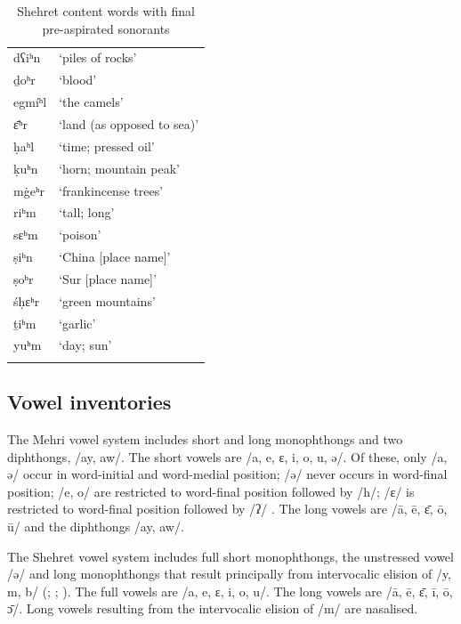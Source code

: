 \documentclass[output=paper]{langscibook}
\begin{document}
\begin{table}
\begin{floatrow}
{\begin{tabular}{ll}
dʕiʰn    &  ‘piles of rocks’           \\
ḏoʰr     &  ‘blood’                    \\
egmíʰl   &  ‘the camels’               \\
ɛ̄ʰr &  ‘land (as opposed to sea)’ \\
ḥaʰl     &  ‘time; pressed oil’        \\
ḳuʰn     &  ‘horn; mountain peak’      \\
m\.geʰr  &  ‘frankincense trees’       \\
riʰm     &  ‘tall; long’               \\
sɛʰm     &  ‘poison’                   \\
ṣiʰn     &  ‘China [place name]’       \\
ṣoʰr     &  ‘Sur [place name]’         \\
śḥɛʰr    &  ‘green mountains’          \\
ṯiʰm     &  ‘garlic’                   \\
yuʰm     &  ‘day; sun’\\
\lspbottomrule
\end{tabular}}
{\caption{Shehret content words with final pre-aspirated sonorants}\label{tab:watson:4}}
\end{floatrow}
\end{table}

\subsection{Vowel inventories}  %
\label{sec:watson:2.3}
The Mehri vowel system includes short and long monophthongs and two diphthongs, /ay, aw/. The short vowels are /a, e, ɛ, i, o, u, ə/. Of these, only /a, ə/ occur in word-initial and word-medial position; \mbox{/ə/} never occurs in word-final position; /e, o/ are restricted to word-final position followed by \mbox{/h/}; \mbox{/ɛ/} is restricted to word-final position followed by \mbox{/ʔ/} \citep{WatsonEtAl2020}. The long vowels are /ā, ē, ɛ̄, ō, ū/ and the diphthongs /ay, aw/.

The Shehret vowel system includes full short monophthongs, the unstressed vowel \mbox{/ə/} and long monophthongs that result principally from intervocalic elision of /y, m, b/ (\citealt{Rubin2014}; \citealt{Dufour2016}; \citealt{WatsonKathiri2022}). The full vowels are /a, e, ɛ, i, o, u/. The long vowels are /ā, ē, ɛ̄, ī, ō, ɔ̄/. Long vowels resulting from the intervocalic elision of \mbox{/m/} are nasalised.
\end{document}
